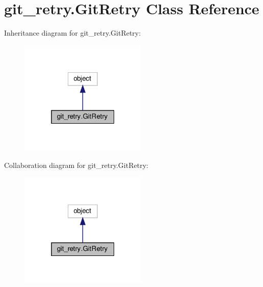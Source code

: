 \hypertarget{classgit__retry_1_1GitRetry}{}\section{git\+\_\+retry.\+Git\+Retry Class Reference}
\label{classgit__retry_1_1GitRetry}


Inheritance diagram for git\+\_\+retry.\+Git\+Retry\+:
\nopagebreak
\begin{figure}[H]
\begin{center}
\leavevmode
\includegraphics[width=172pt]{classgit__retry_1_1GitRetry__inherit__graph}
\end{center}
\end{figure}


Collaboration diagram for git\+\_\+retry.\+Git\+Retry\+:
\nopagebreak
\begin{figure}[H]
\begin{center}
\leavevmode
\includegraphics[width=172pt]{classgit__retry_1_1GitRetry__coll__graph}
\end{center}
\end{figure}
